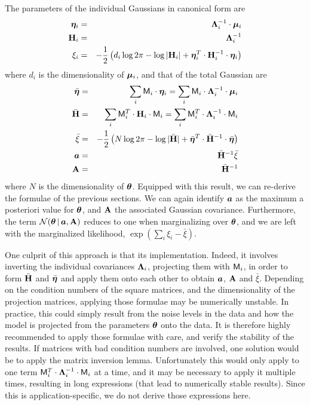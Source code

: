 The parameters of the individual Gaussians in canonical form are
\begin{eqnarray}
\boldsymbol{\eta}_i &=& \mathbf{\Lambda}_i^{-1} \cdot \boldsymbol{\mu}_i \\
\mathbf{H}_i  &=& \mathbf{\Lambda}_i^{-1}\\
\xi_i &=& -\frac{1}{2}\left( d_i \log 2\pi -\log|\mathbf{H}_i| + \boldsymbol{\eta}_i^T \cdot \mathbf{H}_i^{-1}\cdot \boldsymbol{\eta}_i \right)
\end{eqnarray}
where $d_i$ is the dimensionality of $\boldsymbol{\mu}_i$, and that of the total Gaussian are
\begin{eqnarray}
\bar{\boldsymbol{\eta}} &=& \sum_i \mathsf{M}_i \cdot \boldsymbol{\eta}_i = \sum_i \mathsf{M}_i \cdot  \mathbf{\Lambda}_i^{-1} \cdot \boldsymbol{\mu}_i  \\
\bar{\mathbf{H}} &=& \sum_i  \mathsf{M}_i^T\cdot \mathbf{H}_i\cdot \mathsf{M}_i = \sum_i  \mathsf{M}_i^T\cdot \mathbf{\Lambda}_i^{-1}\cdot \mathsf{M}_i \\
 \bar{\xi} &=&  -\frac{1}{2}\left( N\log 2\pi -\log|\bar{\mathbf{H}} | + \bar{\boldsymbol{\eta}}^T \cdot \bar{\mathbf{H}}^{-1}\cdot \bar{\boldsymbol{\eta}} \right)\\
\boldsymbol{a} &=&  \bar{\mathbf{H}}^{-1} \bar{\xi} \\
\mathbf{A} &=& \bar{\mathbf{H}}^{-1}
\end{eqnarray}
where $N$ is the dimensionality of $\boldsymbol{\theta}$.
Equipped with this result, we can re-derive the formulae of the previous sections.
We can again identify $\boldsymbol{a}$ as the maximum a posteriori value for $\boldsymbol{\theta}$, and $\mathbf{A}$ the associated Gaussian covariance.
Furthermore, the term $ \mathcal{N}\!\,(\boldsymbol{\theta}\,|\,\boldsymbol{a},\mathbf{A}) $ reduces to one when marginalizing over $\boldsymbol{\theta}$, and we are left with the marginalized likelihood, $ \exp\left(\textstyle{\sum_i} \xi_i - \bar{\xi} \right)$.

One culprit of this approach is that its implementation. Indeed, it involves inverting the individual covariances $\mathbf{\Lambda}_i$, projecting them with $\mathsf{M}_i$, in order to form $\bar{\mathbf{H}}$ and  $\bar{\boldsymbol{\eta}}$ and apply them onto each other to obtain $\boldsymbol{a}$, $\mathbf{A}$ and $ \bar{\xi}$. Depending on the condition numbers of the square matrices, and the dimensionality of the projection matrices, applying those formulae may be numerically unstable. In practice, this could simply result from the noise levels in the data and how the model is projected from the parameters $\boldsymbol{\theta}$ onto the data.
It is therefore highly recommended to apply those formulae with care, and verify the stability of the results.
If matrices with bad condition numbers are involved, one solution would be to apply the matrix inversion lemma. Unfortunately this would only apply to one term $\mathsf{M}_i^T\cdot \mathbf{\Lambda}_i^{-1}\cdot \mathsf{M}_i$ at a time, and it may be necessary to apply it multiple times, resulting in long expressions (that lead to numerically stable results).
Since this is application-specific, we do not derive those expressions here.



